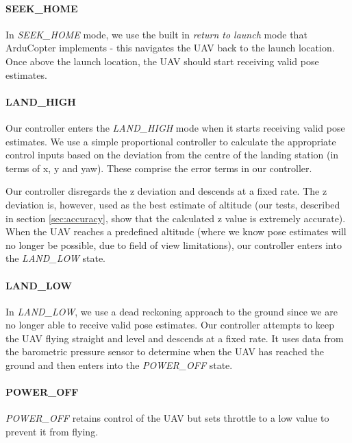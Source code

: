 \documentclass[10pt]{scrartcl} %
\begin{document}
\paragraph{SEEK\_HOME}
In \textit{SEEK\_HOME} mode, we use the built in \textit{return to launch} mode that ArduCopter implements - this navigates the UAV back to the launch location. Once above the launch location, the UAV should start receiving valid pose estimates.

\paragraph{LAND\_HIGH}
Our controller enters the \textit{LAND\_HIGH} mode when it starts receiving valid pose estimates. We use a simple proportional controller to calculate the appropriate control inputs based on the deviation from the centre of the landing station (in terms of x, y and yaw). These comprise the error terms in our controller.

Our controller disregards the z deviation and descends at a fixed rate. The z deviation is, however, used as the best estimate of altitude (our tests, described in section \ref{sec:accuracy}, show that the calculated z value is extremely accurate). When the UAV reaches a predefined altitude (where we know pose estimates will no longer be possible, due to field of view limitations), our controller enters into the \textit{LAND\_LOW} state.

\paragraph{LAND\_LOW}
In \textit{LAND\_LOW}, we use a dead reckoning approach to the ground since we are no longer able to receive valid pose estimates. Our controller attempts to keep the UAV flying straight and level and descends at a fixed rate. It uses data from the barometric pressure sensor to determine when the UAV has reached the ground and then enters into the \textit{POWER\_OFF} state.

\paragraph{POWER\_OFF}
\textit{POWER\_OFF} retains control of the UAV but sets throttle to a low value to prevent it from flying.
\end{document}

